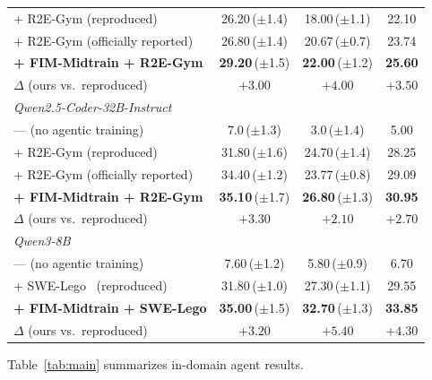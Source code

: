 \begin{table}[t]
\begin{tabular}{lccc}
\quad + R2E-Gym (reproduced)                          & 26.20\,($\pm$1.4)          & 18.00\,($\pm$1.1)          & 22.10 \\
\quad + R2E-Gym (officially reported)                 & 26.80\,($\pm$1.4)          & 20.67\,($\pm$0.7)          & 23.74 \\
\quad \textbf{+ FIM-Midtrain + R2E-Gym}               & \textbf{29.20}\,($\pm$1.5) & \textbf{22.00}\,($\pm$1.2) & \textbf{25.60} \\
\rowcolor{blue!8}
\quad\quad $\Delta$ (ours vs.\ reproduced)            & $+3.00$                    & $+4.00$                    & $+3.50$ \\
\midrule
\multicolumn{4}{l}{\textit{Qwen2.5-Coder-32B-Instruct}} \\
\quad --- (no agentic training)                       & 7.0\,($\pm$1.3)            & 3.0\,($\pm$1.4)            & 5.00 \\
\quad + R2E-Gym (reproduced)                          & 31.80\,($\pm$1.6)          & 24.70\,($\pm$1.4)          & 28.25 \\
\quad + R2E-Gym (officially reported)                 & 34.40\,($\pm$1.2)          & 23.77\,($\pm$0.8)          & 29.09 \\
\quad \textbf{+ FIM-Midtrain + R2E-Gym}               & \textbf{35.10}\,($\pm$1.7) & \textbf{26.80}\,($\pm$1.3) & \textbf{30.95} \\
\rowcolor{blue!8}
\quad\quad $\Delta$ (ours vs.\ reproduced)            & $+3.30$                    & $+2.10$                    & $+2.70$ \\
\midrule
\multicolumn{4}{l}{\textit{Qwen3-8B}} \\
\quad --- (no agentic training)                       & 7.60\,($\pm$1.2)           & 5.80\,($\pm$0.9)           & 6.70 \\
\quad + SWE-Lego~\citep{swelego} (reproduced)         & 31.80\,($\pm$1.0)          & 27.30\,($\pm$1.1)          & 29.55 \\
\quad \textbf{+ FIM-Midtrain + SWE-Lego}              & \textbf{35.00}\,($\pm$1.5) & \textbf{32.70}\,($\pm$1.3) & \textbf{33.85} \\
\rowcolor{blue!8}
\quad\quad $\Delta$ (ours vs.\ reproduced)            & $+3.20$                    & $+5.40$                    & $+4.30$ \\
\bottomrule
\end{tabular}
\end{table}

Table~\ref{tab:main} summarizes in-domain agent results.

